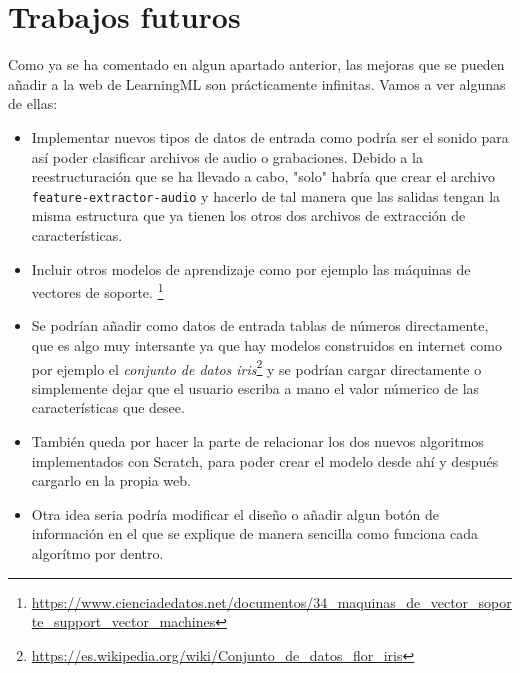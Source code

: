 \documentclass[a4paper, 12pt]{book}
\begin{document}
\section{Trabajos futuros}
\label{sec:trabajos_futuros}

Como ya se ha comentado en algun apartado anterior, las mejoras que se pueden añadir a la web de LearningML son prácticamente infinitas. Vamos a ver algunas de ellas: 

\begin{itemize}
  	\item  Implementar nuevos tipos de datos de entrada como podría ser el sonido para así poder clasificar archivos de audio o grabaciones. Debido a la reestructuración que se ha llevado a cabo, "solo" habría que crear el archivo \texttt{feature-extractor-audio} y hacerlo de tal manera que las salidas tengan la misma estructura que ya tienen los otros dos archivos de extracción de características.

	\item Incluir otros modelos de aprendizaje como por ejemplo las máquinas de vectores de soporte. \footnote{\url{https://www.cienciadedatos.net/documentos/34_maquinas_de_vector_soporte_support_vector_machines}}

	\item Se podrían añadir como datos de entrada tablas de números directamente, que es algo muy intersante ya que hay modelos construidos en internet como por ejemplo el \emph{conjunto de datos iris}\footnote{\url{https://es.wikipedia.org/wiki/Conjunto_de_datos_flor_iris}} y se podrían cargar directamente o simplemente dejar que el usuario escriba a mano el valor númerico de las características que desee. 

	\item También queda por hacer la parte de relacionar los dos nuevos algoritmos implementados con Scratch, para poder crear el modelo desde ahí y después cargarlo en la propia web. 

	\item Otra idea seria podría modificar el diseño o añadir algun botón de información en el que se explique de manera sencilla como funciona cada algorítmo por dentro.
\end{itemize}


\end{document}
